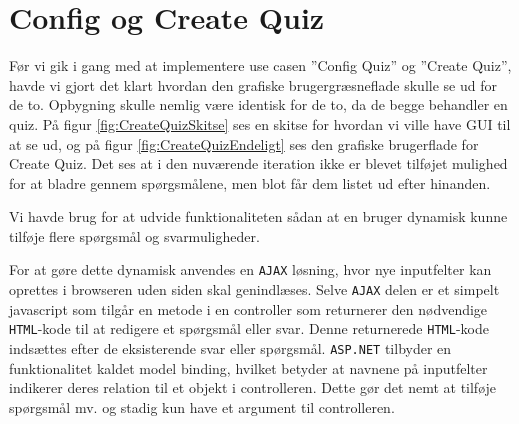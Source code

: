 \section{Config og Create Quiz}
Før vi gik i gang med at implementere use casen ''Config Quiz'' og ''Create Quiz'', havde vi gjort det klart hvordan den grafiske brugergræsneflade skulle se ud for de to. Opbygning skulle nemlig være identisk for de to, da de begge behandler en quiz. På figur \ref{fig:CreateQuizSkitse} ses en skitse for hvordan vi ville have GUI til at se ud, og på figur \ref{fig:CreateQuizEndeligt} ses den grafiske brugerflade for Create Quiz. Det ses at i den nuværende iteration ikke er blevet tilføjet mulighed for at bladre gennem spørgsmålene, men blot får dem listet ud efter hinanden.

\begin{minipage}{0.45\textwidth}
\end{minipage}
\begin{minipage}{0.55\textwidth}
\end{minipage}

\vspace{6 mm}

Vi havde brug for at udvide funktionaliteten sådan at en bruger dynamisk kunne tilføje flere spørgsmål og svarmuligheder.

For at gøre dette dynamisk anvendes en \verb+AJAX+ løsning, hvor nye inputfelter kan oprettes i browseren uden siden skal genindlæses.
Selve \verb+AJAX+ delen er et simpelt javascript som tilgår en metode i en controller som returnerer den nødvendige \verb+HTML+-kode til at redigere et spørgsmål eller svar. Denne returnerede \verb+HTML+-kode indsættes efter de eksisterende svar eller spørgsmål. \verb+ASP.NET+ tilbyder en funktionalitet kaldet model binding, hvilket betyder at navnene på inputfelter indikerer deres relation til et objekt i controlleren. Dette gør det nemt at tilføje spørgsmål mv. og stadig kun have et argument til controlleren.